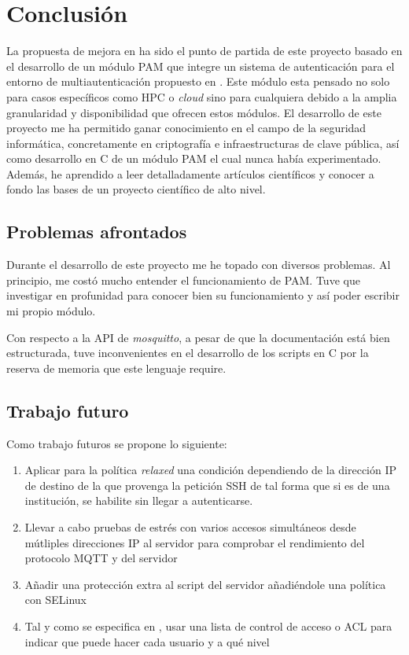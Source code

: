 \chapter{Conclusión}
\label{chap:conclusion}

La propuesta de mejora en \cite{tesisIliaBlockin} ha sido el punto de partida de este proyecto basado en el desarrollo de un 
módulo PAM que integre un sistema de autenticación para el entorno de multiautenticación propuesto en \cite{multipauthpaper}. 
Este módulo esta pensado no solo para casos específicos como HPC o \textit{cloud} sino para cualquiera debido a la amplia 
granularidad y disponibilidad que ofrecen estos módulos. 
El desarrollo de este proyecto me ha permitido ganar conocimiento en el campo de la seguridad informática, concretamente en 
criptografía e infraestructuras de clave pública, así como desarrollo en C de un módulo PAM el cual nunca había experimentado.
Además, he aprendido a leer detalladamente artículos científicos y conocer a fondo las bases de un proyecto científico de alto 
nivel.

\section{Problemas afrontados}

Durante el desarrollo de este proyecto me he topado con diversos problemas. Al principio, me costó mucho entender el funcionamiento
de PAM. Tuve que investigar en profunidad para conocer bien su funcionamiento y así poder escribir mi propio módulo. 

Con respecto a la API de \textit{mosquitto}, a pesar de que la documentación \cite{mosquittoconf_2021} está bien estructurada,
tuve inconvenientes en el desarrollo de los scripts en C por la reserva de memoria que este lenguaje require.

\section{Trabajo futuro}

Como trabajo futuros se propone lo siguiente:

\begin{enumerate}
    \item Aplicar para la política \textit{relaxed} una condición dependiendo de la dirección IP de destino de la que provenga 
    la petición SSH de tal forma que si es de una institución, se habilite sin llegar a autenticarse.
    \item Llevar a cabo pruebas de estrés con varios accesos simultáneos desde mútliples direcciones IP al servidor para 
    comprobar el rendimiento del protocolo MQTT y del servidor
    \item Añadir una protección extra al script del servidor añadiéndole una política con SELinux
    \item Tal y como  se especifica en \cite{multipauthpaper}, usar una lista de control de acceso o ACL para indicar que puede
    hacer cada usuario y a qué nivel
\end{enumerate}